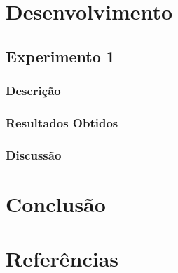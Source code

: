 \documentclass[
	12pt,				%
	oneside,			%
	a4paper,			%
	chapter=TITLE,
	sumario=tradicional,
	english,			%
	brazil				%
]{abntex2}
\begin{document}
\lipsum[1-2]

\chapter{Desenvolvimento}

\section{Experimento 1}

\subsection{Descrição}

\subsection{Resultados Obtidos}

\subsection{Discussão}

\lipsum[1-2]

\chapter{Conclusão}\label{cap:conclusao} 

\lipsum[1-2]


\chapter{Referências}\label{cap:referencias} 

\lipsum[1-2]
\end{document}
